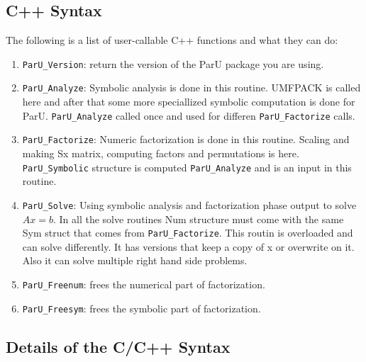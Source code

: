 \documentclass[12pt]{article}
\begin{document}
\subsection{C++ Syntax}

The following is a list of user-callable C++ functions and what they
can do:

\begin{enumerate}

    \item \verb'ParU_Version': return the version of the ParU package 
        you are using.

    \item \verb'ParU_Analyze': Symbolic analysis is done in this routine. 
        UMFPACK is called here and after that some more speciallized symbolic
        computation is done for ParU. 
        \verb'ParU_Analyze' called once and used for differen 
        \verb'ParU_Factorize'
        calls.
    \item \verb'ParU_Factorize': 
        Numeric factorization is done in this routine. Scaling and
        making Sx matrix, computing factors and permutations is here. 
        \verb'ParU_Symbolic' structure is computed \verb'ParU_Analyze' 
        and is an input in this routine.

    \item \verb'ParU_Solve':  
        Using symbolic analysis and factorization phase output to solve $Ax=b$.
        In all the solve routines Num structure must come with the same 
        Sym struct that comes from \verb'ParU_Factorize'. 
        This routin is overloaded and can solve differently. It has versions 
        that keep a copy of x or overwrite on it. Also it can solve multiple 
        right hand side problems.

    \item \verb'ParU_Freenum':  frees the numerical part of factorization.


    \item \verb'ParU_Freesym':  frees the symbolic part of factorization.

\end{enumerate}

\subsection{Details of the C/C++ Syntax}
\end{document}
